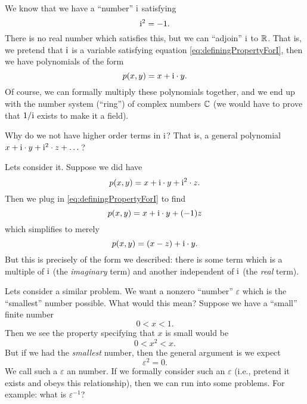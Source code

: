We know that we have a ``number'' $\mathrm{i}$ satisfying
\begin{equation}
\mathrm{i}^{2}=-1.\label{eq:definingPropertyForI}
\end{equation}
There is no real number which satisfies this, but we can ``adjoin''
$\mathrm{i}$ to $\mathbb{R}$. That is, we pretend that $\mathrm{i}$ is a variable
satisfying equation \eqref{eq:definingPropertyForI}, then we have
polynomials of the form
\begin{equation}
p(x,y)=x+\mathrm{i}\cdot y.
\end{equation}
Of course, we can formally multiply these polynomials together,
and we end up with the number system (``ring'') of complex numbers
$\mathbb{C}$ (we would have to prove that $1/\mathrm{i}$ exists to make it a
field). 
\begin{problem}
Why do we not have higher order terms in $\mathrm{i}$? That is, a general
polynomial $x+\mathrm{i}\cdot y+\mathrm{i}^{2}\cdot z + \dots$?
\end{problem}
Lets consider it. Suppose we did have
\begin{equation}
p(x,y)=x+\mathrm{i}\cdot y+\mathrm{i}^{2}\cdot z.
\end{equation}
Then we plug in \eqref{eq:definingPropertyForI} to find
\begin{equation}
p(x,y)=x+\mathrm{i}\cdot y+(-1) z
\end{equation}
which simplifies to merely
\begin{equation}
p(x,y)=(x-z)+\mathrm{i}\cdot y.
\end{equation}
But this is precisely of the form we described: there is some
term which is a multiple of $\mathrm{i}$ (the \emph{imaginary} term) and
another independent of $\mathrm{i}$ (the \emph{real} term).

Lets consider a similar problem. We want a nonzero ``number''
$\varepsilon$ which is the ``smallest'' number possible. What would
this mean? Suppose we have a ``small'' finite number
\begin{equation}
0<x<1.
\end{equation}
Then we see the property specifying that $x$ is small would be
\begin{equation}
0<x^{2}<x.
\end{equation}
But if we had the \emph{smallest} number, then the general
argument is we expect
\begin{equation}
\varepsilon^2=0.
\end{equation}
We call such a $\varepsilon$ an  number.
If we formally consider such an $\varepsilon$ (i.e., pretend it
exists and obeys this relationship), then we can run into some
problems. For example: what is $\varepsilon^{-1}$?


